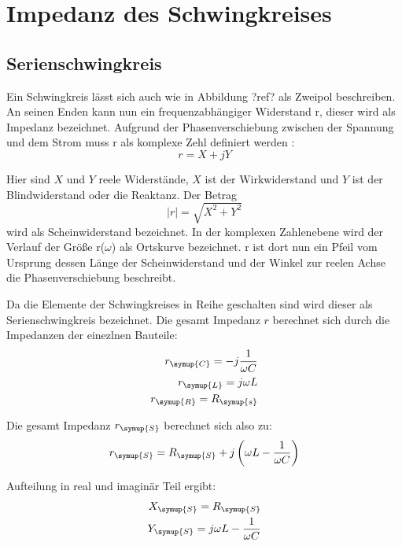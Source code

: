     \section{Impedanz des Schwingkreises}

        \subsection{Serienschwingkreis}

    \noindent Ein Schwingkreis lässt sich auch wie in Abbildung ?ref? als Zweipol beschreiben. An seinen Enden kann nun ein frequenzabhängiger 
    Widerstand r, dieser wird als Impedanz bezeichnet. Aufgrund der Phasenverschiebung zwischen der Spannung und dem Strom muss r als 
    komplexe Zehl definiert werden :
    \begin{equation}
        r = X + jY \nonumber
    \end{equation}

    \noindent Hier sind $X$ und $Y$ reele Widerstände, $X$ ist  der Wirkwiderstand und $Y$ ist der Blindwiderstand oder die Reaktanz. Der Betrag
    \begin{equation}
        |r| = \sqrt{X^2 + Y^2} \nonumber
    \end{equation}
    \noindent wird als Scheinwiderstand bezeichnet. In der komplexen Zahlenebene wird der Verlauf der Größe r($\omega$) als Ortskurve bezeichnet. 
    r ist dort nun ein Pfeil vom Ursprung dessen Länge der Scheinwiderstand und der Winkel zur reelen Achse die Phasenverschiebung 
    beschreibt.

    \noindent Da die Elemente der Schwingkreises in Reihe geschalten sind wird dieser als Serienschwingkreis bezeichnet. Die gesamt Impedanz $r$ berechnet 
    sich durch die Impedanzen der einezlnen Bauteile:
    \begin{align}
        r_{\symup{C}} = -j\frac{1}{\omega C} \nonumber\\
        r_{\symup{L}} = j\omega L  \nonumber\\
        r_{\symup{R}} = R_{\symup{s}} \nonumber
    \end{align}

    \noindent Die gesamt Impedanz $r_{\symup{S}}$ berechnet sich also zu:
    \begin{equation}
        r_{\symup{S}} = R_{\symup{S}} + j \left(    \omega L - \frac{1}{\omega C} \right) \nonumber
    \end{equation}

    \noindent Aufteilung in real und imaginär Teil ergibt:
    \begin{align}
        X_{\symup{S}} = R_{\symup{S}}  \nonumber\\ 
        Y_{\symup{S}} = j \omega L - \frac{1}{\omega C} \nonumber
    \end{align}

